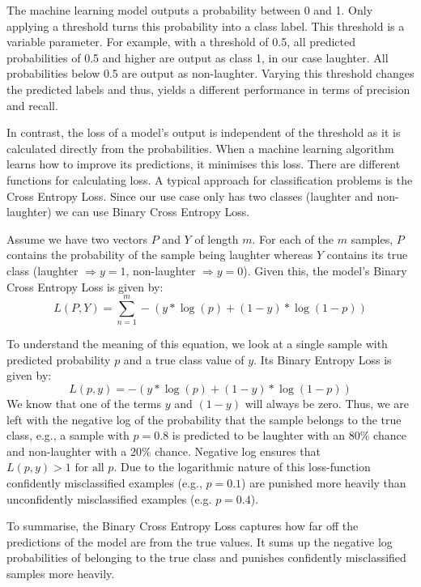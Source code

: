 \documentclass[bsc,frontabs,parskip,deptreport]{infthesis}
\begin{document}
The machine learning model outputs a probability between 0 and 1. Only applying a threshold turns this probability into a class label. This threshold is a variable parameter.
For example, with a threshold of 0.5, all predicted probabilities of 0.5 and higher are output as class 1, in our case laughter. All probabilities below 0.5 are output as non-laughter. 
Varying this threshold changes the predicted labels and thus, yields a different performance in terms of precision and recall. 

In contrast, the loss of a model's output is independent of the threshold as it is calculated directly from the probabilities.
When a machine learning algorithm learns how to improve its predictions, it minimises this loss. There are different functions for calculating loss.
A typical approach for classification problems is the Cross Entropy Loss. Since our use case only has two classes (laughter and non-laughter) we can use Binary Cross Entropy Loss. 

Assume we have two vectors $P$ and $Y$ of length $m$. For each of the $m$ samples, $P$ contains the probability of the sample being laughter whereas $Y$ contains its true class (laughter $\Rightarrow y=1$, non-laughter $ \Rightarrow y=0$).
Given this, the model's Binary Cross Entropy Loss is given by:
$$ L(P,Y) = \sum_{n=1}^{m}  -{(y*\log(p) + (1 - y)*\log(1 - p))}$$

To understand the meaning of this equation, we look at a single sample with predicted probability $p$ and a true class value of $y$. Its Binary Entropy Loss is given by: 
$$ L(p,y) = -{(y*\log(p) + (1 - y)*\log(1 - p))} $$
We know that one of the terms $y$ and $(1-y)$ will always be zero.
Thus, we are left with the negative log of the probability that the sample belongs to the true class, e.g., a sample with $p=0.8$ is predicted to be laughter with an 80\% chance and non-laughter with a 20\% chance. Negative log ensures that $L(p,y) > 1  \textrm{ for all } p $. 
Due to the logarithmic nature of this loss-function confidently misclassified examples (e.g., $p=0.1$) are punished more heavily than unconfidently misclassified examples (e.g. $p=0.4$).

To summarise, the Binary Cross Entropy Loss captures how far off the predictions of the model are from the true values. It sums up the negative log probabilities of belonging to the true class and punishes confidently misclassified samples more heavily.

%
\end{document}
